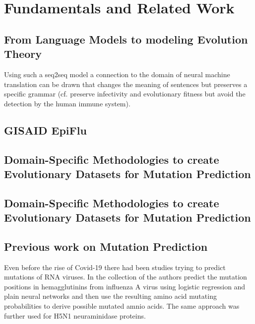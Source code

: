 \section{Fundamentals and Related Work} \label{fundamentals}

\subsection{From Language Models to modeling Evolution Theory} \label{fundamentalsA}

Using such a seq2seq model a connection to the domain of neural machine translation can be drawn that changes the meaning of sentences but preserves a specific grammar (cf. preserve infectivity and evolutionary fitness but avoid the detection by the human immune system).

\subsection{GISAID EpiFlu} \label{fundamentalsB}

\subsection{Domain-Specific Methodologies to create Evolutionary  Datasets for Mutation Prediction} \label{fundamentalsC}

\subsection{Domain-Specific Methodologies to create Evolutionary  Datasets for Mutation Prediction} \label{fundamentalsD}

\subsection{Previous work on Mutation Prediction} \label{fundamentalsE}


Even before the rise of Covid-19 there had been studies trying to predict mutations of RNA viruses. In the collection of \cite{Wu2007, Yan2007, Wu2008} the authors predict the mutation positions in hemagglutinins from influenza A virus using logistic regression and plain neural networks and then use the resulting amino acid mutating probabilities to derive possible mutated amnio acids. The same approach was further used for H5N1 neuraminidase proteins. 


